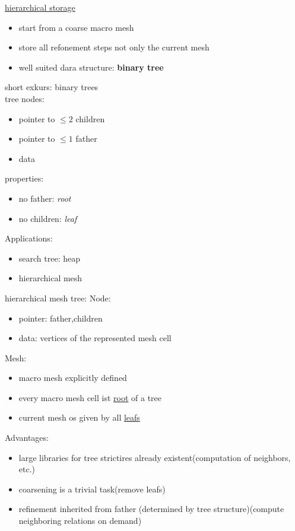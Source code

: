\underline{hierarchical storage}\\
\begin{itemize}
	\item start from a coarse \glqq macro mesh \grqq
	\item store all refonement steps not only the current mesh
	\item well suited dara structure: \textbf{binary tree}
\end{itemize}

short exkurs: binary trees\\
tree nodes:
\begin{itemize}
	\item pointer to $\leq 2$ children
	\item pointer to $\leq 1$ father
	\item data
\end{itemize}
properties:
\begin{itemize}
	\item no father: \textit{root}
	\item no children: \textit{leaf}
\end{itemize}

Applications:
\begin{itemize}
	\item search tree: heap
	\item hierarchical mesh
\end{itemize}

hierarchical mesh tree:
Node:
\begin{itemize}
	\item pointer: father,children
	\item data: vertices of the represented mesh cell
\end{itemize}

Mesh:
\begin{itemize}
	\item macro mesh explicitly defined
	\item every macro mesh cell ist \underline{root} of a tree
	\item current mesh os given by all \underline{leafs}
\end{itemize}

Advantages:
\begin{itemize}
	\item large libraries for tree strictires already existent(computation of neighbors, etc.)
	\item coarsening is a trivial task(remove leafs)
	\item refinement inherited from father (determined by tree structure)(compute neighboring relations \glqq on demand\grqq)
\end{itemize}

